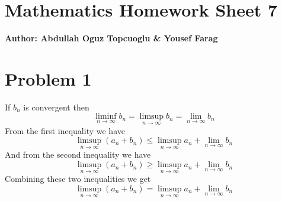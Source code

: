 \documentclass{article}
\begin{document}
\section*{\huge Mathematics Homework Sheet 7}
\begin{flushright}
   \textbf{Author: Abdullah Oguz Topcuoglu \& Yousef Farag}
\end{flushright}

\section*{Problem 1}


If \(b_n\) is convergent then
\[
   \liminf_{n \rightarrow \infty} b_n = \limsup_{n \rightarrow \infty} b_n = \lim_{n \rightarrow \infty} b_n
\]
From the first inequality we have
\[
   \limsup_{n \rightarrow \infty} (a_n + b_n) \leq \limsup_{n \rightarrow \infty} a_n + \lim_{n \rightarrow \infty} b_n
\]
And from the second inequality we have
\[
   \limsup_{n \rightarrow \infty} (a_n + b_n) \geq \limsup_{n \rightarrow \infty} a_n + \lim_{n \rightarrow \infty} b_n
\]
Combining these two inequalities we get
\[
   \limsup_{n \rightarrow \infty} (a_n + b_n) = \limsup_{n \rightarrow \infty} a_n + \lim_{n \rightarrow \infty} b_n
\]
\end{document}
